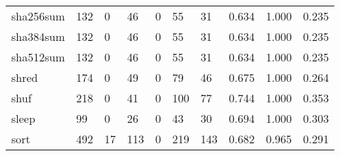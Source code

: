 \begin{longtable}{lp{1.3cm}p{1.3cm}p{1.3cm}p{1.3cm}p{1.3cm}p{1.3cm}p{1.3cm}p{1.3cm}p{1.3cm}}
sha256sum &                    132 &                                  0 &                                46 &                                0 &                                55 &                              31 &                                0.634 &                                  1.000 &                                0.235 \\
sha384sum &                    132 &                                  0 &                                46 &                                0 &                                55 &                              31 &                                0.634 &                                  1.000 &                                0.235 \\
sha512sum &                    132 &                                  0 &                                46 &                                0 &                                55 &                              31 &                                0.634 &                                  1.000 &                                0.235 \\
shred     &                    174 &                                  0 &                                49 &                                0 &                                79 &                              46 &                                0.675 &                                  1.000 &                                0.264 \\
shuf      &                    218 &                                  0 &                                41 &                                0 &                               100 &                              77 &                                0.744 &                                  1.000 &                                0.353 \\
sleep     &                     99 &                                  0 &                                26 &                                0 &                                43 &                              30 &                                0.694 &                                  1.000 &                                0.303 \\
sort      &                    492 &                                 17 &                               113 &                                0 &                               219 &                             143 &                                0.682 &                                  0.965 &                                0.291 \\

\end{longtable}

